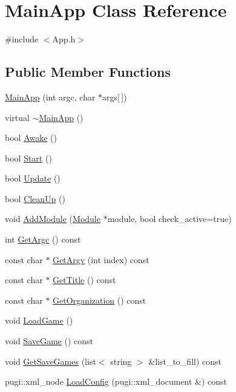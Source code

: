 \hypertarget{class_main_app}{}\section{Main\+App Class Reference}
\label{class_main_app}


{\ttfamily \#include $<$App.\+h$>$}

\subsection*{Public Member Functions}
\begin{DoxyCompactItemize}
\item 
\mbox{\hyperlink{class_main_app_a29ac7c9a40977302f01f9d9176eedd0e}{Main\+App}} (int argc, char $\ast$args\mbox{[}$\,$\mbox{]})
\item 
virtual \mbox{\hyperlink{class_main_app_a1da72f01017840ab6165e33b76cc8482}{$\sim$\+Main\+App}} ()
\item 
bool \mbox{\hyperlink{class_main_app_a63073f5b488b5ed746f3613cf51cb09f}{Awake}} ()
\item 
bool \mbox{\hyperlink{class_main_app_ae17fe90944a2c89a3573170850b089ad}{Start}} ()
\item 
bool \mbox{\hyperlink{class_main_app_a0568590ab3d5426d3b3817c333720dd2}{Update}} ()
\item 
bool \mbox{\hyperlink{class_main_app_abe7994c7f7afdd4e154ff03cc7c606bb}{Clean\+Up}} ()
\item 
void \mbox{\hyperlink{class_main_app_a2ce751f8952d6486d8c1f0dcf7f35a97}{Add\+Module}} (\mbox{\hyperlink{class_module}{Module}} $\ast$module, bool check\+\_\+active=true)
\item 
int \mbox{\hyperlink{class_main_app_a9a114ab6796b54d741bf2542432c2657}{Get\+Argc}} () const
\item 
const char $\ast$ \mbox{\hyperlink{class_main_app_a380ad5dbdbfc0e00862af9ed2e31ce6b}{Get\+Argv}} (int index) const
\item 
const char $\ast$ \mbox{\hyperlink{class_main_app_a0cb5a69066bd6d229e3e17a6e77a696a}{Get\+Title}} () const
\item 
const char $\ast$ \mbox{\hyperlink{class_main_app_aa5614899d2bedcdf809241ec8f09b3c7}{Get\+Organization}} () const
\item 
void \mbox{\hyperlink{class_main_app_a40389ace217438c370f5539239d856ac}{Load\+Game}} ()
\item 
void \mbox{\hyperlink{class_main_app_a837f779a744ef4534c48c9a392759b3a}{Save\+Game}} () const
\item 
void \mbox{\hyperlink{class_main_app_a66af164e7fdff787248470993f25d56f}{Get\+Save\+Games}} (list$<$ string $>$ \&list\+\_\+to\+\_\+fill) const
\item 
pugi\+::xml\+\_\+node \mbox{\hyperlink{class_main_app_a7da69d9070f9a2ca8c0fc975e4c3b9ab}{Load\+Config}} (pugi\+::xml\+\_\+document \&) const
\end{DoxyCompactItemize}
